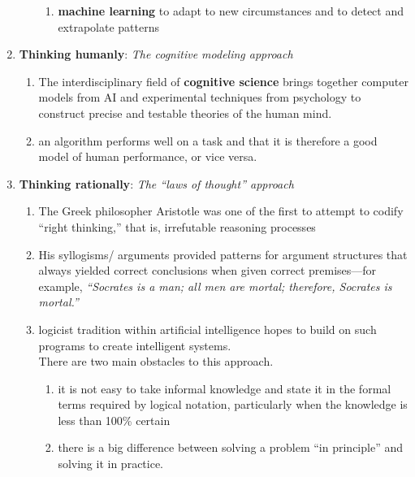\begin{enumerate}[itemsep=0.2cm]
\begin{enumerate}
\begin{enumerate}
            \item \textbf{machine learning} to adapt to new circumstances and to detect and extrapolate patterns
        \end{enumerate}
    \end{enumerate}

    \item \textbf{Thinking humanly}: \textit{The cognitive modeling approach} 
    \begin{enumerate}
        \item The interdisciplinary field of \textbf{cognitive science} brings together computer models from AI and experimental techniques from psychology to construct precise and testable theories of the human mind. 

        \item an algorithm performs well on a task and that it is therefore a good model of human performance, or vice versa.
    \end{enumerate}

    \item \textbf{Thinking rationally}: \textit{The “laws of thought” approach}
    \begin{enumerate}
        \item The Greek philosopher Aristotle was one of the first to attempt to codify “right thinking,” that is, irrefutable reasoning processes

        \item His syllogisms/ arguments provided patterns for argument structures that always yielded correct conclusions when given correct premises—for example, \textit{“Socrates is a man; all men are mortal; therefore, Socrates is mortal.”}

        \item logicist tradition within artificial intelligence hopes to build on such programs to create intelligent systems. \\
        There are two main obstacles to this approach.
        \begin{enumerate}
            \item it is not easy to take informal knowledge and state it in the formal terms required by logical notation, particularly when the knowledge is less than 100\% certain

            \item there is a big difference between solving a problem “in principle” and solving it in practice.
        \end{enumerate}
    \end{enumerate}


\end{enumerate}
